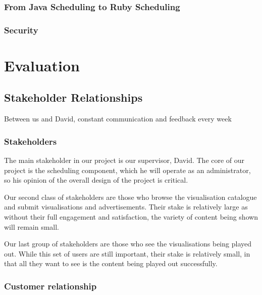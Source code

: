 ﻿\documentclass[a4paper, titlepage]{article}
\begin{document}

\subsubsection{From Java Scheduling to Ruby Scheduling}


\subsubsection{Security}



\newpage
\section{Evaluation}

\subsection{Stakeholder Relationships}
Between us and David, constant communication and feedback every week


\subsubsection{Stakeholders}

The main stakeholder in our project is our supervisor, David. The core of our project is the scheduling component, which he will operate as an administrator, so his opinion of the overall design of the project is critical.

Our second class of stakeholders are those who browse the visualisation catalogue and submit visualisations and advertisements. Their stake is relatively large as without their full engagement and satisfaction, the variety of content being shown will remain small. 

Our last group of stakeholders are those who see the visualisations being played out. While this set of users are still important, their stake is relatively small, in that all they want to see is the content being played out successfully.

\subsubsection{Customer relationship}
\end{document}
